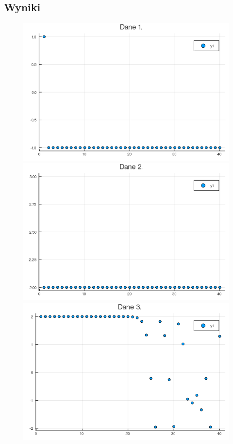 \documentclass[11pt, a4paper]{article}
\begin{document}
\subsection{Wyniki}
\begin{figure}[H]
  \begin{minipage}{0.4\textwidth}
    \centering
    \includegraphics[width=\linewidth]{plot1}
  \end{minipage}
  \begin{minipage}{0.4\textwidth}
    \centering
    \includegraphics[width=\linewidth]{plot2}
  \end{minipage}
  \begin{minipage}{0.4\textwidth}
    \centering
    \includegraphics[width=\linewidth]{plot3}

\end{minipage}
\end{figure}
\end{document}
